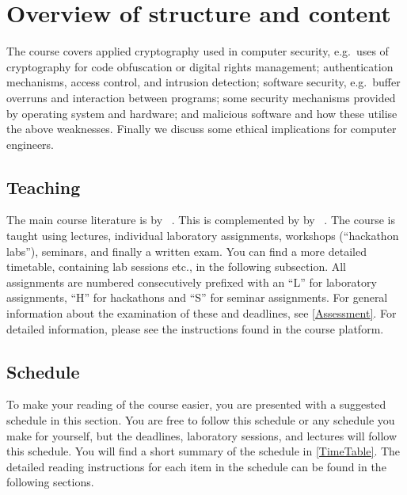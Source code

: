 \section{Overview of structure and content}%
\label{CourseOutline}
The course covers
applied cryptography used in computer security, e.g.~uses of cryptography for 
code obfuscation or digital rights management;
authentication mechanisms, access control, and intrusion detection;
software security, e.g.~buffer overruns and interaction between programs;
some security mechanisms provided by operating system and hardware;
and malicious software and how these utilise the above weaknesses.
Finally we discuss some ethical implications for computer engineers.

\subsection{Teaching}

The main course literature is  by 
\citeauthor{Gollmann2011cs}~\cite{Gollmann2011cs}.
This is complemented by  by 
\citeauthor{Anderson2008sea}~\cite{Anderson2008sea}.
The course is taught using lectures, individual laboratory assignments, 
workshops (\enquote{hackathon labs}), seminars, and finally a written exam.
You can find a more detailed timetable, containing lab sessions etc., in the 
following subsection.
All assignments are numbered consecutively prefixed with an \enquote{L} for 
laboratory assignments, \enquote{H} for hackathons and \enquote{S} for seminar 
assignments.
For general information about the examination of these and deadlines, see 
\cref{Assessment}.
For detailed information, please see the instructions found in the course 
platform.

\subsection{Schedule}%
\label{Schedule}

To make your reading of the course easier, you are presented with a suggested 
schedule in this section.
You are free to follow this schedule or any schedule you make for yourself, but 
the deadlines, laboratory sessions, and lectures will follow this schedule.
You will find a short summary of the schedule in \cref{TimeTable}.
The detailed reading instructions for each item in the schedule can be found in 
the following sections.

